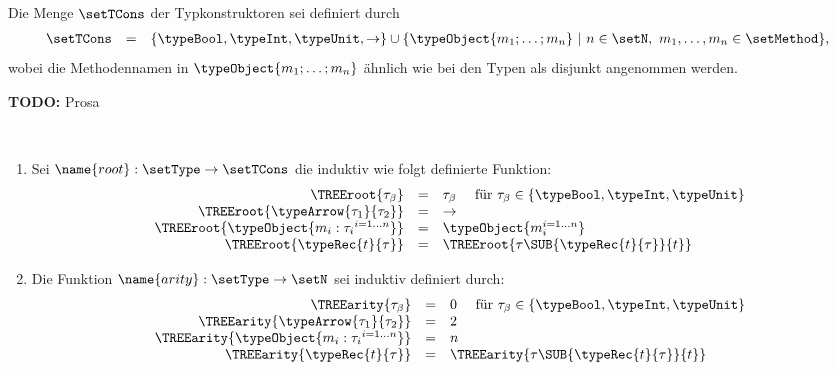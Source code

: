 \begin{definition} \label{definition:Lort:Typkonstruktoren}
  Die Menge $\setTCons$ der Typkonstruktoren sei definiert durch
  \[\begin{array}{rcl}
    \setTCons & = & \{\typeBool,\typeInt,\typeUnit,\to\}
               \cup \{\typeObject{m_1;\ldots;m_n}\ |\ n\in\setN,\ m_1,\ldots,m_n\in\setMethod\},
  \end{array}\]
  wobei die Methodennamen in $\typeObject{m_1;\ldots;m_n}$ \"ahnlich wie bei den Typen als disjunkt
  angenommen werden.
\end{definition}

{\bf TODO:} Prosa

\begin{definition} \label{definition:Lort:Tree_Funktionen} \
  \begin{enumerate}
    \item Sei $\name{root}:\setType\to\setTCons$ die induktiv wie folgt definierte Funktion:
          \[\begin{array}{rcl}
            \TREEroot{\tau_\beta} & = & \tau_\beta \quad \text{ f\"ur } \tau_\beta \in \{\typeBool,\typeInt,\typeUnit\} \\
            \TREEroot{\typeArrow{\tau_1}{\tau_2}} & = & \to \\
            \TREEroot{\typeObject{{m_i:\tau_i}^{i=1 \ldots n}}} & = & \typeObject{m_i^{i=1 \ldots n}} \\
            \TREEroot{\typeRec{t}{\tau}} & = & \TREEroot{\tau\SUB{\typeRec{t}{\tau}}{t}}
          \end{array}\]

    \item Die Funktion $\name{arity}:\setType\to\setN$ sei induktiv definiert durch:
          \[\begin{array}{rcl}
            \TREEarity{\tau_\beta} & = & 0 \quad \text{ f\"ur } \tau_\beta \in \{\typeBool,\typeInt,\typeUnit\} \\
            \TREEarity{\typeArrow{\tau_1}{\tau_2}} & = & 2 \\
            \TREEarity{\typeObject{{m_i:\tau_i}^{i=1 \ldots n}}} & = & n \\
            \TREEarity{\typeRec{t}{\tau}} & = & \TREEarity{\tau\SUB{\typeRec{t}{\tau}}{t}}
          \end{array}\]


\end{enumerate}
\end{definition}
